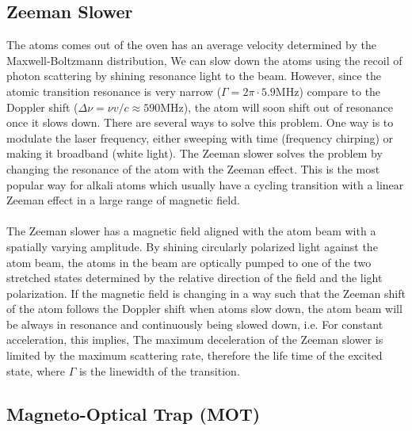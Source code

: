 \subsection{Zeeman Slower}\label{theory:zeeman}

The atoms comes out of the oven has an average velocity determined by the Maxwell-Boltzmann distribution,
We can slow down the atoms using the recoil of photon scattering by shining resonance light to the beam. However, since the atomic transition resonance is very narrow ($\Gamma=2\pi\cdot5.9\text{MHz}$) compare to the Doppler shift ($\Delta\nu=\nu v/c\approx590\text{MHz}$), the atom will soon shift out of resonance once it slows down. There are several ways to solve this problem. One way is to modulate the laser frequency, either sweeping with time (frequency chirping) or making it broadband (white light). The Zeeman slower solves the problem by changing the resonance of the atom with the Zeeman effect. This is the most popular way for alkali atoms which usually have a cycling transition with a linear Zeeman effect in a large range of magnetic field\cite{verenna}.\\
\\
The Zeeman slower has a magnetic field aligned with the atom beam with a spatially varying amplitude. By shining circularly polarized light against the atom beam, the atoms in the beam are optically pumped to one of the two stretched states determined by the relative direction of the field and the light polarization. If the magnetic field is changing in a way such that the Zeeman shift of the atom follows the Doppler shift when atoms slow down, the atom beam will be always in resonance and continuously being slowed down, i.e.
For constant acceleration, this implies,
The maximum deceleration of the Zeeman slower is limited by the maximum scattering rate, therefore the life time of the excited state,
where $\Gamma$ is the linewidth of the transition.

\subsection{Magneto-Optical Trap (MOT)}\label{theory:mot}

